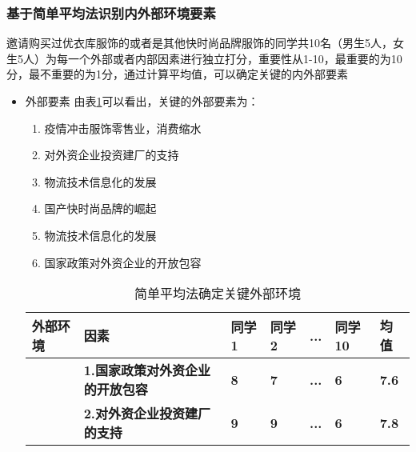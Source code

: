 \documentclass{xjtureport}
\begin{document}
\subsubsection{基于简单平均法识别内外部环境要素}
邀请购买过优衣库服饰的或者是其他快时尚品牌服饰的同学共10名（男生5人，女生5人）为每一个外部或者内部因素进行独立打分，重要性从1-10，最重要的为10分，最不重要的为1分，通过计算平均值，可以确定关键的内外部要素
\begin{itemize}
    \item 外部要素
    由表\ref{简单平均法}可以看出，关键的外部要素为：
    \begin{enumerate}
        \item  疫情冲击服饰零售业，消费缩水
        \item 对外资企业投资建厂的支持
        \item 物流技术信息化的发展
        \item 国产快时尚品牌的崛起 
        \item 物流技术信息化的发展 
        \item 国家政策对外资企业的开放包容
    \end{enumerate}
\begin{table}[H]
    \renewcommand\arraystretch{1.5}
    \centering
    \caption{简单平均法确定关键外部环境}
    \label{简单平均法}
    \begin{tabular}{cllllll}
    \hline
    \multicolumn{1}{l}{\textbf{外部环境}}                                                                                                 & \textbf{因素}                                        & \textbf{同学1}                      & \textbf{同学2}                      & ...                                 & \textbf{同学10}                     & \textbf{均值}                         \\ \hline
    \multicolumn{1}{c|}{}                                                                                                             & {\color[HTML]{FE0000} \textbf{1.国家政策对外资企业的开放包容}}   & {\color[HTML]{FE0000} \textbf{8}} & {\color[HTML]{FE0000} \textbf{7}} & {\color[HTML]{FE0000} \textbf{...}} & {\color[HTML]{FE0000} \textbf{6}} & {\color[HTML]{FE0000} \textbf{7.6}} \\
    \multicolumn{1}{c|}{}                                                                                                             & {\color[HTML]{FE0000} \textbf{2.对外资企业投资建厂的支持}}     & {\color[HTML]{FE0000} \textbf{9}} & {\color[HTML]{FE0000} \textbf{9}} & {\color[HTML]{FE0000} \textbf{...}} & {\color[HTML]{FE0000} \textbf{6}} & {\color[HTML]{FE0000} \textbf{7.8}} \\

\end{tabular}
\end{table}
\end{itemize}
\end{document}
